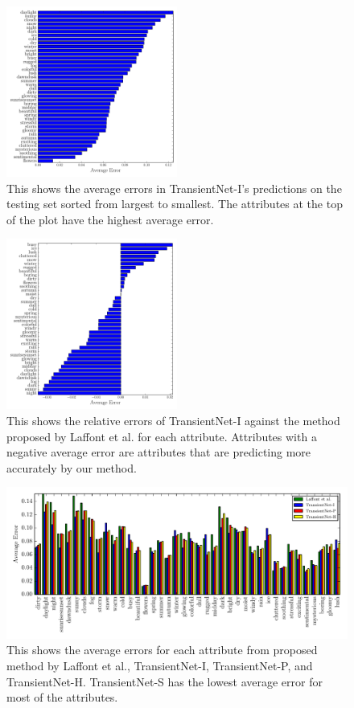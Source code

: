 \documentclass{article}
\begin{document}
\begin{figure}[t]
	\centering
		\includegraphics[width=0.5\textwidth]{figs/sorted_err_cmr.pdf}
		\caption{This shows the average errors in TransientNet-I's predictions on the 
						 testing set sorted from largest to smallest.  The attributes at 
						 the top of the plot have the highest average error.}
		\label{fig:sort}
\end{figure}

\begin{figure}[t]
	\centering
		\includegraphics[width=0.5\textwidth]{figs/rel_err_cmr.pdf}
		\caption{This shows the relative errors of TransientNet-I against the method 
						 proposed by Laffont et al. for each attribute.  Attributes with a 
						 negative average error are attributes that are predicting more 
						 accurately by our method.}
		\label{fig:relerr}
\end{figure}

\begin{figure}[t]
	\centering
		\includegraphics[width=1.0\textwidth]{figs/avg_err_compare_cmr.pdf}
		\caption{This shows the average errors for each attribute from proposed method
						 by Laffont et al., TransientNet-I, TransientNet-P, and TransientNet-H.  
             TransientNet-S has the lowest average error for most of the attributes.}
		\label{fig:compare}
\end{figure}
\end{document}
